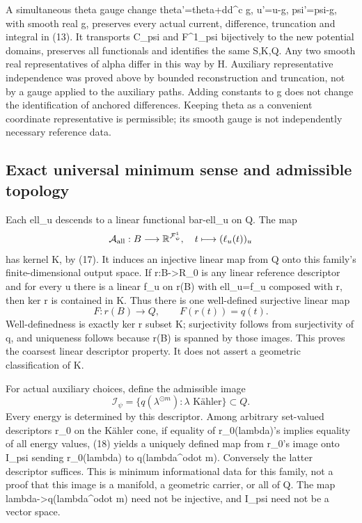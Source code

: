 \documentclass[
]{article}
\begin{document}
A simultaneous theta gauge change theta'=theta+dd\^{}c g, u'=u-g,
psi'=psi-g, with smooth real g, preserves every actual current,
difference, truncation and integral in (13). It transports C\_psi and
F\^{}1\_psi bijectively to the new potential domains, preserves all
functionals and identifies the same S,K,Q. Any two smooth real
representatives of alpha differ in this way by H. Auxiliary
representative independence was proved above by bounded reconstruction
and truncation, not by a gauge applied to the auxiliary paths. Adding
constants to g does not change the identification of anchored
differences. Keeping theta as a convenient coordinate representative is
permissible; its smooth gauge is not independently necessary reference
data.

\subsection{Exact universal minimum sense and admissible
topology}\label{exact-universal-minimum-sense-and-admissible-topology}

Each ell\_u descends to a linear functional bar-ell\_u on Q. The map \[
\mathcal A_{\rm all}:B\longrightarrow\mathbb R^{\mathcal F^1_\psi},
\quad t\longmapsto(\ell_u(t))_u
\] has kernel K, by (17). It induces an injective linear map from Q onto
this family's finite-dimensional output space. If r:B-\textgreater R\_0
is any linear reference descriptor and for every u there is a linear
f\_u on r(B) with ell\_u=f\_u composed with r, then ker r is contained
in K. Thus there is one well-defined surjective linear map \[
F:r(B)\longrightarrow Q,\qquad F(r(t))=q(t).
\] Well-definedness is exactly ker r subset K; surjectivity follows from
surjectivity of q, and uniqueness follows because r(B) is spanned by
those images. This proves the coarsest linear descriptor property. It
does not assert a geometric classification of K.

For actual auxiliary choices, define the admissible image \[
\mathcal I_\psi=\{q(\lambda^{\odot m}):\lambda\text{ Kähler}\}\subset Q.
\] Every energy is determined by this descriptor. Among arbitrary
set-valued descriptors r\_0 on the Kähler cone, if equality of
r\_0(lambda)'s implies equality of all energy values, (18) yields a
uniquely defined map from r\_0's image onto I\_psi sending r\_0(lambda)
to q(lambda\^{}odot m). Conversely the latter descriptor suffices. This
is minimum informational data for this family, not a proof that this
image is a manifold, a geometric carrier, or all of Q. The map
lambda-\textgreater q(lambda\^{}odot m) need not be injective, and
I\_psi need not be a vector space.
\end{document}
